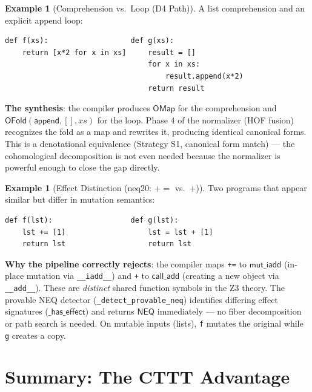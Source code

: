 \documentclass[11pt,a4paper]{report}
\theoremstyle{definition}
\newtheorem{example}[definition]{Example}
\theoremstyle{plain}
\begin{document}
\begin{example}[Comprehension vs.\ Loop (D4 Path)]
\label{ex:case-comp-loop}
A list comprehension and an explicit append loop:
\begin{lstlisting}
def f(xs):                   def g(xs):
    return [x*2 for x in xs]     result = []
                                 for x in xs:
                                     result.append(x*2)
                                 return result
\end{lstlisting}

\textbf{The synthesis}: the compiler produces $\mathsf{OMap}$ for the
comprehension and $\mathsf{OFold}(\mathsf{append}, [], xs)$ for the
loop.  Phase 4 of the normalizer (HOF fusion) recognizes the fold as
a map and rewrites it, producing identical canonical forms.  This is a
denotational equivalence (Strategy S1, canonical form match) ---
the cohomological decomposition is not even needed because the
normalizer is powerful enough to close the gap directly.
\end{example}

\begin{example}[Effect Distinction (neq20: $\mathsf{+=}$ vs.\ $+$)]
\label{ex:case-effect}
Two programs that appear similar but differ in mutation semantics:
\begin{lstlisting}
def f(lst):                  def g(lst):
    lst += [1]                   lst = lst + [1]
    return lst                   return lst
\end{lstlisting}

\textbf{Why the pipeline correctly rejects}: the compiler
maps \texttt{+=} to $\mathsf{mut\_iadd}$ (in-place mutation
via \texttt{\_\_iadd\_\_}) and \texttt{+} to $\mathsf{call\_add}$
(creating a new object via \texttt{\_\_add\_\_}).  These are
\emph{distinct} shared function symbols in the Z3 theory.  The
provable NEQ detector (\texttt{\_detect\_provable\_neq}) identifies
differing effect signatures ($\mathsf{\_has\_effect}$) and returns
$\mathsf{NEQ}$ immediately --- no fiber decomposition or path search
is needed.  On mutable inputs (lists), \texttt{f} mutates the
original while \texttt{g} creates a copy.
\end{example}

\section{Summary: The CTTT Advantage}
\end{document}
